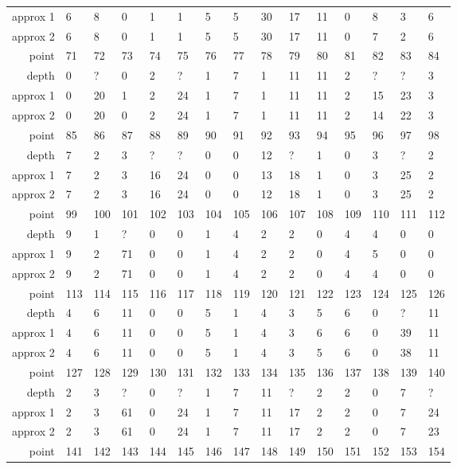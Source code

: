 \begin{center}
\begin{supertabular}{|r|l l l l l l l l l l l l l l|}
approx 1 & 6 & 8 & 0 & 1 & 1 & 5 & 5 & 30 & 17 & 11 & 0 & 8 & 3 & 6 \\
approx 2 & 6 & 8 & 0 & 1 & 1 & 5 & 5 & 30 & 17 & 11 & 0 & 7 & 2 & 6 \\
\hline
point & 71 & 72 & 73 & 74 & 75 & 76 & 77 & 78 & 79 & 80 & 81 & 82 & 83 & 84 \\
\hline
depth & 0 & ? & 0 & 2 & ? & 1 & 7 & 1 & 11 & 11 & 2 & ? & ? & 3 \\
approx 1 & 0 & 20 & 1 & 2 & 24 & 1 & 7 & 1 & 11 & 11 & 2 & 15 & 23 & 3 \\
approx 2 & 0 & 20 & 0 & 2 & 24 & 1 & 7 & 1 & 11 & 11 & 2 & 14 & 22 & 3 \\
\hline
point & 85 & 86 & 87 & 88 & 89 & 90 & 91 & 92 & 93 & 94 & 95 & 96 & 97 & 98 \\
\hline
depth & 7 & 2 & 3 & ? & ? & 0 & 0 & 12 & ? & 1 & 0 & 3 & ? & 2 \\
approx 1 & 7 & 2 & 3 & 16 & 24 & 0 & 0 & 13 & 18 & 1 & 0 & 3 & 25 & 2 \\
approx 2 & 7 & 2 & 3 & 16 & 24 & 0 & 0 & 12 & 18 & 1 & 0 & 3 & 25 & 2 \\
\hline
point & 99 & 100 & 101 & 102 & 103 & 104 & 105 & 106 & 107 & 108 & 109 & 110 & 111 & 112 \\
\hline
depth & 9 & 1 & ? & 0 & 0 & 1 & 4 & 2 & 2 & 0 & 4 & 4 & 0 & 0 \\
approx 1 & 9 & 2 & 71 & 0 & 0 & 1 & 4 & 2 & 2 & 0 & 4 & 5 & 0 & 0 \\
approx 2 & 9 & 2 & 71 & 0 & 0 & 1 & 4 & 2 & 2 & 0 & 4 & 4 & 0 & 0 \\
\hline
point & 113 & 114 & 115 & 116 & 117 & 118 & 119 & 120 & 121 & 122 & 123 & 124 & 125 & 126 \\
\hline
depth & 4 & 6 & 11 & 0 & 0 & 5 & 1 & 4 & 3 & 5 & 6 & 0 & ? & 11 \\
approx 1 & 4 & 6 & 11 & 0 & 0 & 5 & 1 & 4 & 3 & 6 & 6 & 0 & 39 & 11 \\
approx 2 & 4 & 6 & 11 & 0 & 0 & 5 & 1 & 4 & 3 & 5 & 6 & 0 & 38 & 11 \\
\hline
point & 127 & 128 & 129 & 130 & 131 & 132 & 133 & 134 & 135 & 136 & 137 & 138 & 139 & 140 \\
\hline
depth & 2 & 3 & ? & 0 & ? & 1 & 7 & 11 & ? & 2 & 2 & 0 & 7 & ? \\
approx 1 & 2 & 3 & 61 & 0 & 24 & 1 & 7 & 11 & 17 & 2 & 2 & 0 & 7 & 24 \\
approx 2 & 2 & 3 & 61 & 0 & 24 & 1 & 7 & 11 & 17 & 2 & 2 & 0 & 7 & 23 \\
\hline
point & 141 & 142 & 143 & 144 & 145 & 146 & 147 & 148 & 149 & 150 & 151 & 152 & 153 & 154 \\

\end{supertabular}
\end{center}
